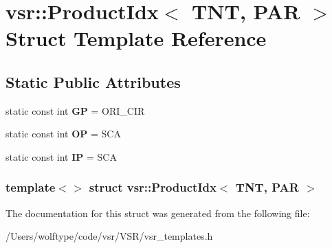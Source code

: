 \hypertarget{structvsr_1_1_product_idx_3_01_t_n_t_00_01_p_a_r_01_4}{\section{vsr\-:\-:Product\-Idx$<$ T\-N\-T, P\-A\-R $>$ Struct Template Reference}
\label{structvsr_1_1_product_idx_3_01_t_n_t_00_01_p_a_r_01_4}
}
\subsection*{Static Public Attributes}
\begin{DoxyCompactItemize}
\item 
\hypertarget{structvsr_1_1_product_idx_3_01_t_n_t_00_01_p_a_r_01_4_a44f7c814e33dafd4ca50e660a773627c}{static const int {\bfseries G\-P} = O\-R\-I\-\_\-\-C\-I\-R}\label{structvsr_1_1_product_idx_3_01_t_n_t_00_01_p_a_r_01_4_a44f7c814e33dafd4ca50e660a773627c}

\item 
\hypertarget{structvsr_1_1_product_idx_3_01_t_n_t_00_01_p_a_r_01_4_a9e6d1c99b62b60a65c5615d870f66ac8}{static const int {\bfseries O\-P} = S\-C\-A}\label{structvsr_1_1_product_idx_3_01_t_n_t_00_01_p_a_r_01_4_a9e6d1c99b62b60a65c5615d870f66ac8}

\item 
\hypertarget{structvsr_1_1_product_idx_3_01_t_n_t_00_01_p_a_r_01_4_a17cc4a1004b8d499df9f61b161e28487}{static const int {\bfseries I\-P} = S\-C\-A}\label{structvsr_1_1_product_idx_3_01_t_n_t_00_01_p_a_r_01_4_a17cc4a1004b8d499df9f61b161e28487}

\end{DoxyCompactItemize}
\subsubsection*{template$<$$>$ struct vsr\-::\-Product\-Idx$<$ T\-N\-T, P\-A\-R $>$}



The documentation for this struct was generated from the following file\-:\begin{DoxyCompactItemize}
\item 
/\-Users/wolftype/code/vsr/\-V\-S\-R/vsr\-\_\-templates.\-h\end{DoxyCompactItemize}
